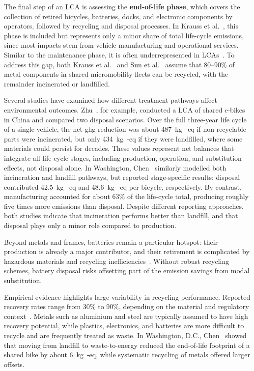         The final step of an LCA is assessing the \textbf{end-of-life phase}, which covers the collection of retired bicycles, batteries, docks, and electronic components by operators, followed by recycling and disposal processes. In Krauss et al.~\cite{Krauss2022}, this phase is included but represents only a minor share of total life-cycle emissions, since most impacts stem from vehicle manufacturing and operational services. Similar to the maintenance phase, it is often underrepresented in LCAs~\cite{Calan2024}. To address this gap, both Krauss et al.~\cite{Krauss2022} and Sun et al.~\cite{Sun2023} assume that 80–90\% of metal components in shared micromobility fleets can be recycled, with the remainder incinerated or landfilled.

        Several studies have examined how different treatment pathways affect environmental outcomes. Zhu~\cite{Zhu2023}, for example, conducted a LCA of shared e-bikes in China and compared two disposal scenarios. Over the full three-year life cycle of a single vehicle, the net \ac{ghg} reduction was about 487~kg~-eq if non-recyclable parts were incinerated, but only 434~kg~-eq if they were landfilled, where some materials could persist for decades. These values represent net balances that integrate all life-cycle stages, including production, operation, and substitution effects, not disposal alone. In Washington, Chen~\cite{Chen2024} similarly modelled both incineration and landfill pathways, but reported stage-specific results: disposal contributed 42.5~kg~-eq and 48.6~kg~-eq per bicycle, respectively. By contrast, manufacturing accounted for about 63\% of the life-cycle total, producing roughly five times more emissions than disposal. Despite different reporting approaches, both studies indicate that incineration performs better than landfill, and that disposal plays only a minor role compared to production.

        Beyond metals and frames, batteries remain a particular hotspot: their production is already a major contributor, and their retirement is complicated by hazardous materials and recycling inefficiencies~\cite{Felipe-Falgas2022, Calan2024}. Without robust recycling schemes, battery disposal risks offsetting part of the emission savings from modal substitution.

        Empirical evidence highlights large variability in recycling performance. Reported recovery rates range from 30\% to 90\%, depending on the material and regulatory context~\cite{Sun2022, Calan2024}. Metals such as aluminium and steel are typically assumed to have high recovery potential, while plastics, electronics, and batteries are more difficult to recycle and are frequently treated as waste. In Washington, D.C., Chen~\cite{Chen2024} showed that moving from landfill to waste-to-energy reduced the end-of-life footprint of a shared bike by about 6~kg~-eq, while systematic recycling of metals offered larger offsets.

